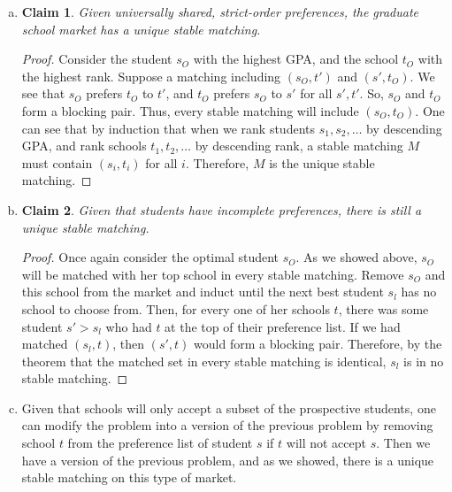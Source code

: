 \documentclass[12pt]{article}
\newtheorem*{claim}{Claim}
\begin{document}
\begin{enumerate}[(a)]
\item
\begin{claim}
Given universally shared, strict-order preferences, the graduate school market has a unique stable matching.
\end{claim}
\begin{proof}
Consider the student $s_O$ with the highest GPA, and the school $t_O$ with the highest rank. Suppose a matching including $(s_O, t')$ and $(s', t_O)$. We see that $s_O$ prefers $t_O$ to $t'$, and $t_O$ prefers $s_O$ to $s'$ for all $s', t'$. So, $s_O$ and $t_O$ form a blocking pair. Thus, every stable matching will include $(s_O, t_O)$. One can see that by induction that when we rank students $s_1, s_2, \ldots$ by descending GPA, and rank schools $t_1, t_2, \ldots$ by descending rank, a stable matching $M$ must contain $(s_i, t_i)$ for all $i$. Therefore, $M$ is the unique stable matching.
\end{proof}

\item 
\begin{claim}
Given that students have incomplete preferences, there is still a unique stable matching.
\end{claim}
\begin{proof}
Once again consider the optimal student $s_O$. As we showed above, $s_O$ will be matched with her top school in every stable matching. Remove $s_O$ and this school from the market and induct until the next best student $s_l$ has no school to choose from. Then, for every one of her schools $t$, there was some student $s' > s_l$ who had $t$ at the top of their preference list. If we had matched $(s_l, t)$, then $(s', t)$ would form a blocking pair. Therefore, by the theorem that the matched set in every stable matching is identical, $s_l$ is in no stable matching. 
\end{proof}

\item Given that schools will only accept a subset of the prospective students, one can modify the problem into a version of the previous problem by removing school $t$ from the preference list of student $s$ if $t$ will not accept $s$. Then we have a version of the previous problem, and as we showed, there is a unique stable matching on this type of market. 

\end{enumerate}
\end{document}
